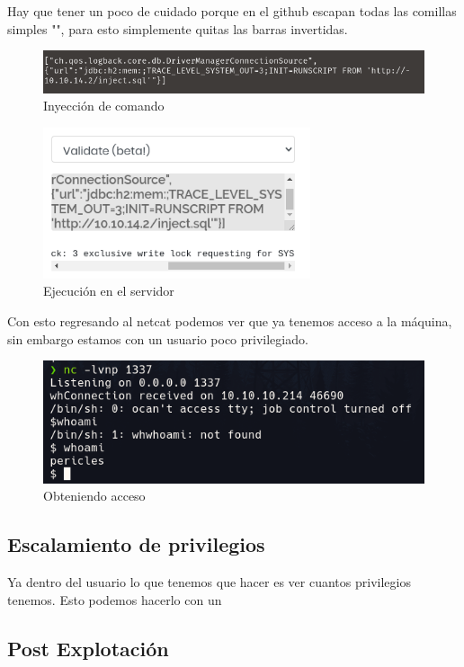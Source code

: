 \documentclass{article}
\begin{document}
Hay que tener un poco de cuidado porque en el github escapan todas las comillas simples "", para esto simplemente quitas las barras invertidas.
\begin{figure}[H]
	\center
	\includegraphics[width=\textwidth]{images/time/comando.png}
	\caption{Inyección de comando}
\end{figure}
\begin{figure}[H]
	\center
	\includegraphics[width=0.7\textwidth]{images/time/ejecucion.png}
	\caption{Ejecución en el servidor}
\end{figure}
Con esto regresando al netcat podemos ver que ya tenemos acceso a la máquina, sin embargo estamos con un usuario poco privilegiado.
\begin{figure}[H]
	\center
	\includegraphics[width=\textwidth]{images/time/acceso.png}
	\caption{Obteniendo acceso}
\end{figure}


\subsection{Escalamiento de privilegios}

Ya dentro del usuario lo que tenemos que hacer es ver cuantos privilegios tenemos. Esto podemos hacerlo con un 

\subsection{Post Explotación}
\end{document}
